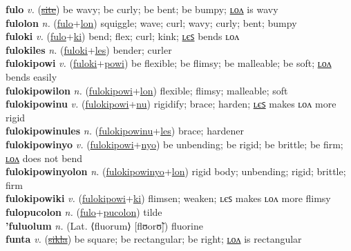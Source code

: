 \textbf{fulo} \textit{v.} (\hyperref[site]{\sout{site}})
be wavy; be curly; be bent; be bumpy; \hyperref[fulolon]{ʟᴏᴧ} is wavy \label{fulo} \\
\textbf{fulolon} \textit{n.} (\hyperref[fulo]{fulo}+\hyperref[lon]{lon})
squiggle; wave; curl; wavy; curly; bent; bumpy \label{fulolon} \\
\textbf{fuloki} \textit{v.} (\hyperref[fulo]{fulo}+\hyperref[ki]{ki})
bend; flex; curl; kink; \hyperref[fulokiles]{ʟєꜱ} bends ʟᴏᴧ \label{fuloki} \\
\textbf{fulokiles} \textit{n.} (\hyperref[fuloki]{fuloki}+\hyperref[les]{les})
bender; curler \label{fulokiles} \\
\textbf{fulokipowi} \textit{v.} (\hyperref[fuloki]{fuloki}+\hyperref[powi]{powi})
be flexible; be flimsy; be malleable; be soft; \hyperref[fulokipowilon]{ʟᴏᴧ} bends easily \label{fulokipowi} \\
\textbf{fulokipowilon} \textit{n.} (\hyperref[fulokipowi]{fulokipowi}+\hyperref[lon]{lon})
flexible; flimsy; malleable; soft \label{fulokipowilon} \\
\textbf{fulokipowinu} \textit{v.} (\hyperref[fulokipowi]{fulokipowi}+\hyperref[nu]{nu})
rigidify; brace; harden; \hyperref[fulokipowinules]{ʟєꜱ} makes ʟᴏᴧ more rigid \label{fulokipowinu} \\
\textbf{fulokipowinules} \textit{n.} (\hyperref[fulokipowinu]{fulokipowinu}+\hyperref[les]{les})
brace; hardener \label{fulokipowinules} \\
\textbf{fulokipowinyo} \textit{v.} (\hyperref[fulokipowi]{fulokipowi}+\hyperref[nyo]{nyo})
be unbending; be rigid; be brittle; be firm; \hyperref[fulokipowinyolon]{ʟᴏᴧ} does not bend \label{fulokipowinyo} \\
\textbf{fulokipowinyolon} \textit{n.} (\hyperref[fulokipowinyo]{fulokipowinyo}+\hyperref[lon]{lon})
rigid body; unbending; rigid; brittle; firm \label{fulokipowinyolon} \\
\textbf{fulokipowiki} \textit{v.} (\hyperref[fulokipowi]{fulokipowi}+\hyperref[ki]{ki})
flimsen; weaken; ʟєꜱ makes ʟᴏᴧ more flimsy \label{fulokipowiki} \\
\textbf{fulopucolon} \textit{n.} (\hyperref[fulo]{fulo}+\hyperref[pucolon]{pucolon})
tilde \label{fulopucolon} \\
\textbf{'fuluolum} \textit{n.} (Lat. ⟨fluorum⟩ [flʊorʊ̃])
fluorine \label{'fuluolum} \\
\textbf{funta} \textit{v.} (\hyperref[sikla]{\sout{sikla}})
be square; be rectangular; be right; \hyperref[funtalon]{ʟᴏᴧ} is rectangular \label{funta} \\
